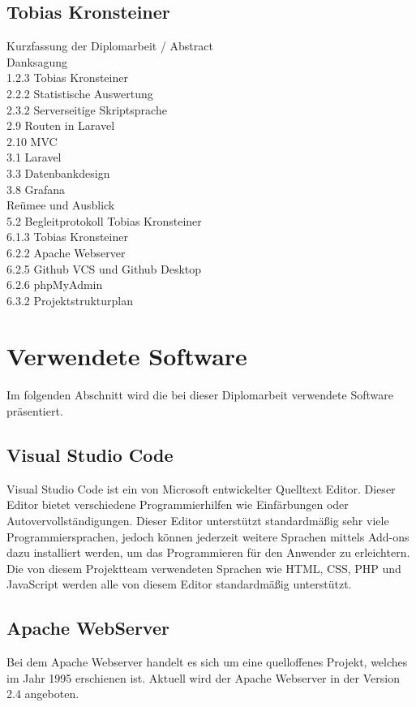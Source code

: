 \subsection{Tobias Kronsteiner}
Kurzfassung der Diplomarbeit / Abstract \\
Danksagung \\
1.2.3 Tobias Kronsteiner\\
2.2.2 Statistische Auswertung \\
2.3.2 Serverseitige Skriptsprache\\
2.9 Routen in Laravel\\
2.10 MVC\\
3.1 Laravel\\
3.3 Datenbankdesign\\
3.8 Grafana\\
Reümee und Ausblick\\
5.2 Begleitprotokoll Tobias Kronsteiner\\
6.1.3 Tobias Kronsteiner\\
6.2.2 Apache Webserver\\
6.2.5 Github VCS und Github Desktop\\
6.2.6 phpMyAdmin\\
6.3.2 Projektstrukturplan\\





\section{Verwendete Software}
Im folgenden Abschnitt wird die bei dieser Diplomarbeit verwendete Software präsentiert.


\subsection{Visual Studio Code}
Visual Studio Code ist ein von Microsoft entwickelter Quelltext Editor. Dieser Editor bietet verschiedene Programmierhilfen wie Einfärbungen oder Autovervollständigungen. Dieser Editor unterstützt standardmäßig sehr viele Programmiersprachen, jedoch können jederzeit weitere Sprachen mittels Add-ons dazu installiert werden, um das Programmieren für den Anwender zu erleichtern. Die von diesem Projektteam verwendeten Sprachen wie HTML, CSS, PHP und JavaScript werden alle von diesem Editor standardmäßig unterstützt. 


\subsection{Apache WebServer}
Bei dem Apache Webserver handelt es sich um eine quelloffenes Projekt, welches im Jahr 1995 erschienen ist. Aktuell wird der Apache Webserver in der Version 2.4 angeboten.
